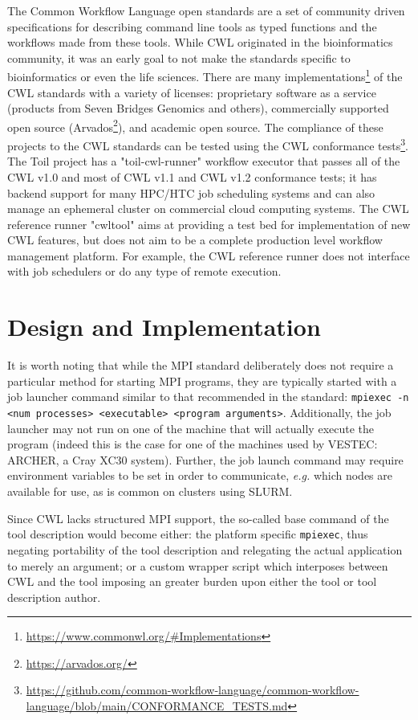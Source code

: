\documentclass[conference]{IEEEtran}
\begin{document}
The Common Workflow Language open standards\cite{cwl10} are a set of community driven specifications for describing command line tools as typed functions and the workflows made from these tools. While CWL originated in the bioinformatics community, it was an early goal to not make the standards specific to bioinformatics or even the life sciences. There are many implementations\footnote{\url{https://www.commonwl.org/#Implementations}} of the CWL standards with a variety of licenses: proprietary software as a service (products from Seven Bridges Genomics and others), commercially supported open source (Arvados\footnote{\url{https://arvados.org/}}), and academic open source. The compliance of these projects to the CWL standards can be tested using the CWL conformance tests\footnote{\url{https://github.com/common-workflow-language/common-workflow-language/blob/main/CONFORMANCE_TESTS.md}}. The Toil\cite{toil} project has a "toil-cwl-runner" workflow executor that passes all of the CWL v1.0 and most of CWL v1.1 and CWL v1.2 conformance tests; it has backend support for many HPC/HTC job scheduling systems and can also manage an ephemeral cluster on commercial cloud computing systems. The CWL reference runner "cwltool" aims at providing a test bed for implementation of new CWL features, but does not aim to be a complete production level workflow management platform. For example, the CWL reference runner does not interface with job schedulers or do any type of remote execution.

\section{Design and Implementation}
\label{sec:imp}
It is worth noting that while the MPI standard deliberately does not require a particular method for starting MPI programs, they are typically started with a job launcher command similar to that recommended in the standard: \texttt{mpiexec -n <num processes> <executable> <program arguments>}. Additionally, the job launcher may not run on one of the machine that will actually execute the program (indeed this is the case for one of the machines used by VESTEC: ARCHER, a Cray XC30 system). Further, the job launch command may require environment variables to be set in order to communicate, \emph{e.g.} which nodes are available for use, as is common on clusters using SLURM.


Since CWL lacks structured MPI support, the so-called base command of the tool description would become either: the platform specific \verb`mpiexec`, thus negating portability of the tool description and relegating the actual application to merely an argument; or a custom wrapper script which interposes between CWL and the tool imposing an greater burden upon either the tool or tool description author.
\end{document}
